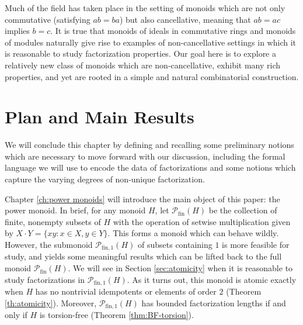 \documentclass{report}
\renewcommand{\P}{\mathcal{P}}
\newcommand{\fin}{\textrm{fin}}
\newcommand{\fun}{{\textrm{fin}, 1}}
\renewcommand{\:}{\text{:}}
\theoremstyle{definition}
\begin{document}

Much of the field has taken place in the setting of monoids which are not only commutative (satisfying $ab = ba$) but also cancellative, meaning that $ab = ac$ implies $b = c$.
It is true that monoids of ideals in commutative rings and monoids of modules naturally give rise to examples of non-cancellative settings in which it is reasonable to study factorization properties. 
Our goal here is to explore a relatively new class of monoids which are non-cancellative, exhibit many rich properties, and yet are rooted in a simple and natural combinatorial construction.


\section{Plan and Main Results}
We will conclude this chapter by defining and recalling some preliminary notions which are necessary to move forward with our discussion, including the formal language we will use to encode the data of factorizations and some notions which capture the varying degrees of non-unique factorization.

Chapter \ref{ch:power monoids} will introduce the main object of this paper: the power monoid.  
In brief, for any monoid $H$, let $\P_\fin(H)$ be the collection of finite, nonempty subsets of $H$ with the operation of setwise multiplication given by $X\cdot Y = \{xy: x\in X, y\in Y\}$.  
This forms a monoid which can behave wildly.
However, the submonoid $\P_\fun(H)$ of subsets containing $1$ is more feasible for study, and yields some meaningful results which can be lifted back to the full monoid $\P_\fin(H)$.
We will see in Section \ref{sec:atomicity} when it is reasonable to study factorizations in $\P_\fun(H)$.
As it turns out, this monoid is atomic exactly when $H$ has no nontrivial idempotents or elements of order $2$ (Theorem \ref{th:atomicity}).
Moreover, $\P_\fun(H)$ has bounded factorization lengths if and only if $H$ is torsion-free (Theorem \ref{thm:BF-torsion}).
\end{document}
